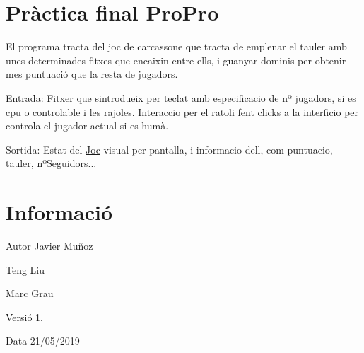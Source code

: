 \hypertarget{index_S}{}\section{Pràctica final Pro\+Pro}\label{index_S}
El programa tracta del joc de carcassone que tracta de emplenar el tauler amb unes determinades fitxes que encaixin entre ells, i guanyar dominis per obtenir mes puntuació que la resta de jugadors.


\begin{DoxyItemize}
\item Entrada\+: Fitxer que s\textquotesingle{}introdueix per teclat amb especificacio de nº jugadors, si es cpu o controlable i les rajoles. Interaccio per el ratoli fent clicks a la interficio per controla el jugador actual si es humà.
\item Sortida\+: Estat del \mbox{\hyperlink{class_joc}{Joc}} visual per pantalla, i informacio d\textquotesingle{}ell, com puntuacio, tauler, nº\+Seguidors...
\end{DoxyItemize}\hypertarget{index_Practica}{}\section{Informació}\label{index_Practica}
\begin{DoxyAuthor}{Autor}
Javier Muñoz 

Teng Liu 

Marc Grau 
\end{DoxyAuthor}
\begin{DoxyVersion}{Versió}
1. 
\end{DoxyVersion}
\begin{DoxyDate}{Data}
21/05/2019 
\end{DoxyDate}
